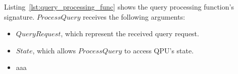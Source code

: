 \noindent
Listing~\ref{lst:query_processing_func} shows the query processing function's signature.
$ProcessQuery$ receives the following arguments:
\begin{itemize}

  \item $QueryRequest$, which represent the received query request.
  \item $State$, which allows $ProcessQuery$ to access QPU's state.







  \item aaa
\end{itemize}















